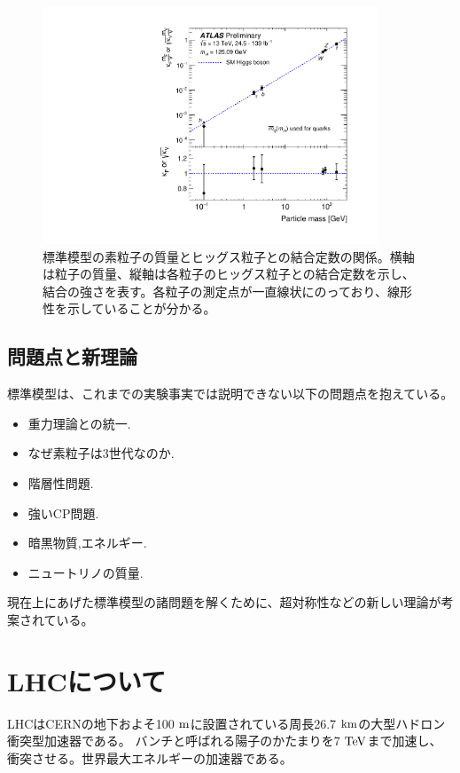 \begin{figure}[bpt]\centering
\includegraphics[width=10cm,angle=270]{./kappa_vs_mass.pdf}
\caption[標準模型の素粒子の質量とヒッグス粒子との結合定数の関係]{標準模型の素粒子の質量とヒッグス粒子との結合定数の関係\cite{1-10}。横軸は粒子の質量、縦軸は各粒子のヒッグス粒子との結合定数を示し、結合の強さを表す。各粒子の測定点が一直線状にのっており、線形性を示していることが分かる。}
\label{kappa_vs_mass}
\end{figure}

\subsection{問題点と新理論}
標準模型は、これまでの実験事実では説明できない以下の問題点を抱えている。
\begin{itemize}
  \item 重力理論との統一.
  \item なぜ素粒子は3世代なのか.
  \item 階層性問題.
  \item 強いCP問題.
  \item 暗黒物質,エネルギー.
  \item ニュートリノの質量.
\end{itemize}

現在上にあげた標準模型の諸問題を解くために、超対称性\cite{1-11}などの新しい理論が考案されている。

\clearpage
\section{LHCについて}
LHCはCERNの地下およそ100 $\rm{m}$に設置されている周長26.7 $\rm{km}$の大型ハドロン衝突型加速器である。
バンチと呼ばれる陽子のかたまりを7 $\rm{TeV}$まで加速し、衝突させる。世界最大エネルギーの加速器である。

